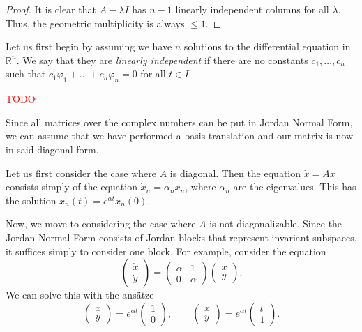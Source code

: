 \documentclass[prb,12pt]{revtex4-2}
\theoremstyle{definition}
\theoremstyle{definition}
\theoremstyle{definition}
\newcommand{\R}{\mathbb{R}}
\begin{document}
\begin{proof}
	It is clear that $A-\lambda I$ has $n-1$ linearly independent columns for all $\lambda$. Thus, the geometric multiplicity is always $\le 1$.
\end{proof}
Let us first begin by assuming we have $n$ solutions to the differential equation in $\R^n$. We say that they are \emph{linearly independent} if there are no constants $c_1, \dots, c_n$ such that $c_1\varphi_1 + \dots + c_n \varphi_n=0$ for all $t\in I$. 

\textcolor{red}{TODO}

Since all matrices over the complex numbers can be put in Jordan Normal Form, we can assume that we have performed a basis translation and our matrix is now in said diagonal form.

Let us first consider the case where $A$ is diagonal. Then the equation $\dot{x} = Ax$ consists simply of the equation $\dot{x}_n= \alpha_n x_n$, where $\alpha_n$ are the eigenvalues. This has the solution $x_n(t) = e^{\alpha t}x_n(0)$. 

Now, we move to considering the case where $A$ is not diagonalizable. Since the Jordan Normal Form consists of Jordan blocks that represent invariant subspaces, it suffices simply to consider one block. For example, consider the equation
\[
\begin{pmatrix} \dot{x} \\ \dot{y} \end{pmatrix} = \begin{pmatrix} \alpha & 1 \\ 0 & \alpha \end{pmatrix} \begin{pmatrix} x \\ y \end{pmatrix} 
.\] 
We can solve this with the ansätze
\[
\begin{pmatrix} x \\ y \end{pmatrix} = e^{\alpha t} \begin{pmatrix} 1 \\ 0 \end{pmatrix}, \qquad \begin{pmatrix} x \\ y \end{pmatrix} = e^{\alpha t} \begin{pmatrix} t \\ 1 \end{pmatrix} 
.\] 
\end{document}
